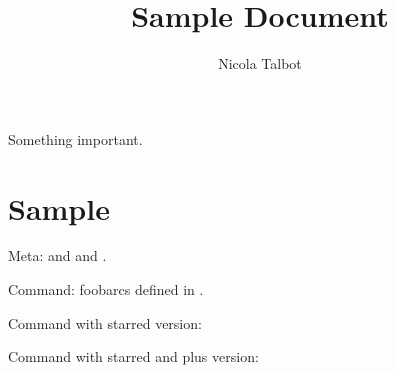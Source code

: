 \documentclass[titlepage=false,index=totoc,bibliography=totoc,
 fontsize=12pt,captions=tableheading]{scrreprt}
\title{Sample Document}
\author{Nicola Talbot}
\begin{document}
\maketitle

\begin{important}
Something important.
\end{important}

\frontmatter
\tableofcontents

\mainmatter
\chapter{Sample}

Meta:  and  and .

Command: \gls{foobarcs} defined in .


Command with starred version:


Command with starred and plus version:


\printterms
\end{document}
